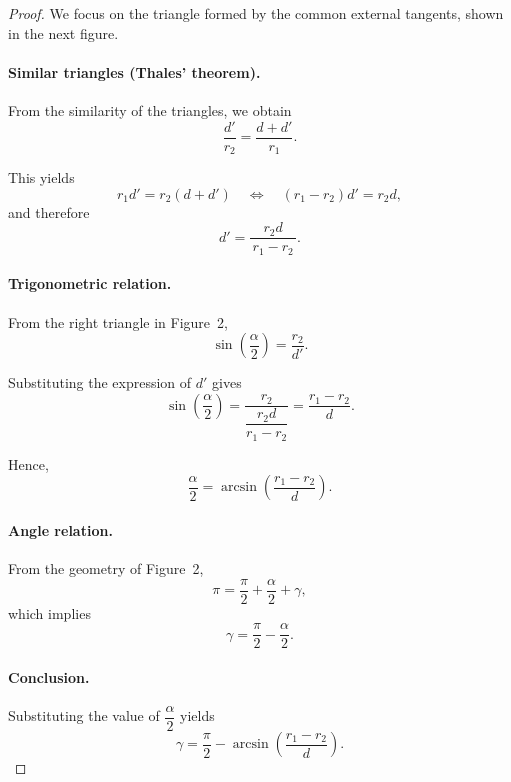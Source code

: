 \documentclass{article}
\begin{document}
\begin{proof}
  We focus on the triangle formed by the common external tangents,
  shown in the next figure.

  \begin{center}
    
  \end{center}

  \paragraph{Similar triangles (Thales' theorem).}

  From the similarity of the triangles, we obtain
  \[
    \frac{d'}{r_2} = \frac{d + d'}{r_1}.
  \]

  This yields
  \[
    r_1 d' = r_2(d + d')
    \quad \Longleftrightarrow \quad
    (r_1 - r_2)d' = r_2 d,
  \]
  and therefore
  \[
    d' = \frac{r_2 d}{\,r_1 - r_2\,}.
  \]

  \paragraph{Trigonometric relation.}

  From the right triangle in Figure~2,
  \[
    \sin\!\left(\frac{\alpha}{2}\right) = \frac{r_2}{d'}.
  \]

  Substituting the expression of $d'$ gives
  \[
    \sin\!\left(\frac{\alpha}{2}\right)
    =
    \frac{r_2}{\dfrac{r_2 d}{r_1 - r_2}}
    =
    \frac{r_1 - r_2}{d}.
  \]

  Hence,
  \[
    \frac{\alpha}{2}
    =
    \arcsin\!\left(\frac{r_1 - r_2}{d}\right).
  \]

  \paragraph{Angle relation.}

  From the geometry of Figure~2,
  \[
    \pi = \frac{\pi}{2} + \frac{\alpha}{2} + \gamma,
  \]
  which implies
  \[
    \gamma = \frac{\pi}{2} - \frac{\alpha}{2}.
  \]

  \paragraph{Conclusion.}

  Substituting the value of $\dfrac{\alpha}{2}$ yields
  \[
    \boxed{
      \gamma
      =
      \frac{\pi}{2}
      -
      \arcsin\!\left(\frac{r_1 - r_2}{d}\right)
    }.
  \]

\end{proof}
\end{document}
